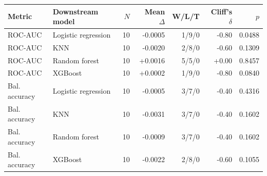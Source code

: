 \begin{tabular}{llrrrrr}
\toprule
Metric & Downstream model & $N$ & Mean $\Delta$ & W/L/T & Cliff's $\delta$ & $p$ \\
\midrule
ROC-AUC & Logistic regression & 10 & -0.0005 & 1/9/0 & -0.80 & 0.0488 \\
ROC-AUC & KNN & 10 & -0.0020 & 2/8/0 & -0.60 & 0.1309 \\
ROC-AUC & Random forest & 10 & +0.0016 & 5/5/0 & +0.00 & 0.8457 \\
ROC-AUC & XGBoost & 10 & +0.0002 & 1/9/0 & -0.80 & 0.0840 \\
\midrule
Bal. accuracy & Logistic regression & 10 & -0.0005 & 3/7/0 & -0.40 & 0.4316 \\
Bal. accuracy & KNN & 10 & -0.0031 & 3/7/0 & -0.40 & 0.1602 \\
Bal. accuracy & Random forest & 10 & -0.0009 & 3/7/0 & -0.40 & 0.1602 \\
Bal. accuracy & XGBoost & 10 & -0.0022 & 2/8/0 & -0.60 & 0.1055 \\
\bottomrule
\end{tabular}
